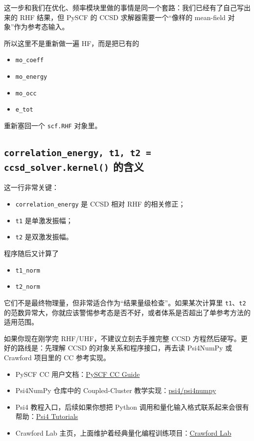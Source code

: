 \documentclass[UTF8,11pt,fontset=fandol]{ctexbook}
\begin{document}
这一步和我们在优化、频率模块里做的事情是同一个套路：我们已经有了自己写出来的 RHF 结果，但 PySCF 的 CCSD 求解器需要一个“像样的 mean-field 对象”作为参考态输入。

所以这里不是重新做一遍 HF，而是把已有的
\begin{itemize}
  \item \texttt{mo\_coeff}
  \item \texttt{mo\_energy}
  \item \texttt{mo\_occ}
  \item \texttt{e\_tot}
\end{itemize}
重新塞回一个 \texttt{scf.RHF} 对象里。

\subsection*{\texttt{correlation\_energy, t1, t2 = ccsd\_solver.kernel()} 的含义}

这一行非常关键：
\begin{itemize}
  \item \texttt{correlation\_energy} 是 CCSD 相对 RHF 的相关修正；
  \item \texttt{t1} 是单激发振幅；
  \item \texttt{t2} 是双激发振幅。
\end{itemize}

程序随后又计算了
\begin{itemize}
  \item \texttt{t1\_norm}
  \item \texttt{t2\_norm}
\end{itemize}
它们不是最终物理量，但非常适合作为“结果量级检查”。如果某次计算里 \texttt{t1}、\texttt{t2} 的范数异常大，你就应该警惕参考态是否不好，或者体系是否超出了单参考方法的适用范围。

\begin{warnbox}[学习上的现实建议]
如果你现在刚学完 RHF/UHF，不建议立刻去手推完整 CCSD 方程然后硬写。更好的路线是：先理解 CCSD 的对象关系和程序接口，再去读 Psi4NumPy 或 Crawford 项目里的 CC 参考实现。
\end{warnbox}

\begin{resourcebox}[继续学习资料]
\begin{itemize}
  \item PySCF CC 用户文档：\href{https://pyscf.org/user/cc.html}{PySCF CC Guide}
  \item Psi4NumPy 仓库中的 Coupled-Cluster 教学实现：\href{https://github.com/psi4/psi4numpy}{psi4/psi4numpy}
  \item Psi4 教程入口，后续如果你想把 Python 调用和量化输入格式联系起来会很有帮助：\href{https://psi4.github.io/psi4docs/1.9.x/index_tutorials.html}{Psi4 Tutorials}
  \item Crawford Lab 主页，上面维护着经典量化编程训练项目：\href{https://crawford.chem.vt.edu/}{Crawford Lab}
\end{itemize}
\end{resourcebox}
\end{document}
